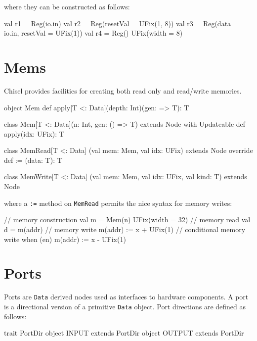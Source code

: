 \documentclass[10pt,twocolumn]{article}
\def\code#1{{\small\tt #1}}
\begin{document}
\noindent
where they can be constructed as follows:

\begin{scala}
val r1 = Reg(io.in)
val r2 = Reg(resetVal = UFix(1, 8))
val r3 = Reg(data = io.in, resetVal = UFix(1))
val r4 = Reg(){ UFix(width = 8) }
\end{scala}

\section{Mems}

Chisel provides facilities for creating both read only and
read/write memories.  

\begin{scala}
object Mem {
  def apply[T <: Data](depth: Int)(gen: => T): T
}

class Mem[T <: Data](n: Int, gen: () => T) 
    extends Node with Updateable {
  def apply(idx: UFix): T
}

class MemRead[T <: Data]
      (val mem: Mem, val idx: UFix) 
    extends Node {
  override def := (data: T): T
}

class MemWrite[T <: Data]
      (val mem: Mem, val idx: UFix, val kind: T) 
    extends Node
\end{scala}

\noindent
where a \code{:=} method on \code{MemRead} permits the nice syntax for
memory writes:

\begin{scala}
// memory construction
val m = Mem(n){ UFix(width = 32) }
// memory read
val d = m(addr)
// memory write
m(addr) := x + UFix(1)
// conditional memory write
when (en) {
  m(addr) := x - UFix(1)
}
\end{scala}


\section{Ports}
\label{sec:ports}

Ports are \code{Data} derived nodes used as interfaces to hardware
components.   A port is a directional version of a primitive
\code{Data} object.  Port directions are defined as follows:

\begin{scala}
trait PortDir
object INPUT  extends PortDir
object OUTPUT extends PortDir
\end{scala}
\end{document}
